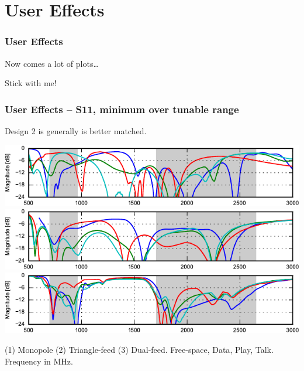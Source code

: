 \section{User Effects}

\def\legendfooter{\scriptsize{(1) Monopole (2) Triangle-feed (3) Dual-feed. \textcolor{bb}{Free-space}, \textcolor{gg}{Data}, \textcolor{rr}{Play}, \textcolor{cc}{Talk}. Frequency in MHz.}}
\def\emptyline{\textcolor{white}{Empty}}
\begin{frame}
    \frametitle{User Effects}
    Now comes a lot of plots\ldots

    Stick with me!
\end{frame}

\begin{frame}
    \frametitle{User Effects -- S11, minimum over tunable range}
    Design 2 is generally is better matched.
    \begin{center}
        \includegraphics{img/soren/ue/design1lt/s11top.pdf}\\
        \includegraphics{img/soren/ue/design2sn/s11top.pdf}\\
        \includegraphics{img/soren/ue/design3hv/s11top.pdf}
    \end{center}
    \legendfooter
\end{frame}


